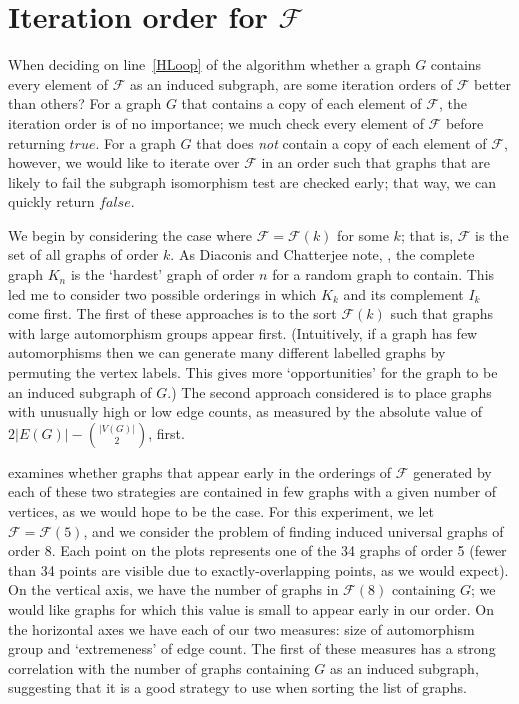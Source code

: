 \documentclass[12pt]{article}
\newcommand{\calF}{\ensuremath{\mathcal{F}}}
\newcommand{\AlgVar}[1]{\mathit{#1}}
\newcommand{\lineref}[1]{line~\ref{#1}}
\begin{document}
\section{Iteration order for $\calF$}\label{sec:iteration-order}

When deciding on \lineref{HLoop} of the algorithm whether a graph $G$ contains
every element of $\calF$ as an induced subgraph, are some iteration orders of
$\calF$ better than others?  For a graph $G$ that contains a copy of each
element of $\calF$, the iteration order is of no importance; we much check
every element of $\calF$ before returning $\AlgVar{true}$.  For a graph $G$ that
does \emph{not} contain a copy of each element of $\calF$, however, we would like
to iterate over $\calF$ in an order such that graphs that are likely to fail the
subgraph isomorphism test are checked early; that way, we can quickly return
$\AlgVar{false}$.

We begin by considering the case where $\calF = \calF(k)$ for some $k$; that is,
$\calF$ is the set of all graphs of order $k$.
As Diaconis and Chatterjee note, \cite{chatterjee2021isomorphisms}, the complete
graph $K_n$ is the `hardest' graph of order $n$ for a random graph to contain.
This led me
to consider two possible orderings in which $K_k$ and its complement $I_k$ come
first.  The first of these approaches is to the sort $\calF(k)$ such that
graphs with large automorphism groups appear first.  (Intuitively, if a graph
has few automorphisms then we can generate many different labelled graphs
by permuting the vertex labels.  This gives more `opportunities' for the
graph to be an induced subgraph of $G$.)
The second approach considered is to place graphs
with unusually high or low edge counts, as measured by the absolute value of
${2|E(G)| - {|V(G)| \choose 2}}$, first.

 examines whether graphs that appear early in the orderings
of $\calF$
generated by each of these two strategies are contained in few graphs with
a given number of vertices, as we would hope to be the case.
For this experiment, we let $\calF = \calF(5)$, and we consider the problem
of finding induced universal graphs of order 8.
Each point on the plots
represents one of the 34 graphs of order 5 (fewer than 34 points are visible
due to exactly-overlapping points, as we would expect).  On the vertical
axis, we have the number of graphs in $\calF(8)$ containing $G$; we would like
graphs for which this value is small to appear early in our order.
On the horizontal axes we have each of our two measures: size of automorphism group
and `extremeness' of edge count.  The first of these measures has a strong correlation
with the number of graphs containing $G$ as an induced subgraph, suggesting that
it is a good strategy to use when sorting the list of graphs.
\end{document}
